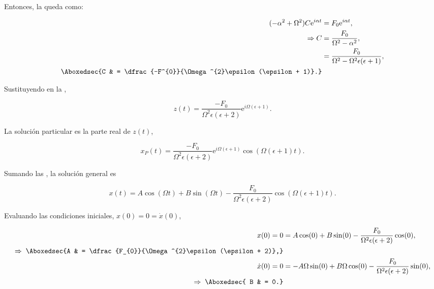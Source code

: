 \documentclass[../main.tex]{subfiles}
\begin{document}
Entonces, la  queda como:

\begin{align*}
	(-\alpha^{2} + \Omega^{2})C \mathrm{e}^{i\alpha t} & = F_{0}\mathrm{e}^{i\alpha t},                                  \\
	\Rightarrow C                                      & = \dfrac{F_{0}}{\Omega^{2} - \alpha^{2}},                       \\
	                                                   & = \dfrac{F_{0}}{\Omega^{2} - \Omega^{2}\epsilon(\epsilon + 1)}, \\
	\Aboxedsec{C                                       & = \dfrac{-F^{0}}{\Omega^{2}\epsilon(\epsilon + 1)}.}
\end{align*}

Sustituyendo en la ,

\begin{equation*}
	z(t) = \dfrac{-F_{0}}{\Omega^{2}\epsilon(\epsilon + 2)}\mathrm{e}^{i\Omega(\epsilon + 1)}.
\end{equation*}

La solución particular es la parte real de \(z(t)\),

\begin{equation}
	x_{P}(t) = \dfrac{-F_{0}}{\Omega^{2}\epsilon(\epsilon + 2)}\mathrm{e}^{i\Omega(\epsilon + 1)}\cos(\Omega(\epsilon + 1)t).
	\label{eq:particular-sol}
\end{equation}

Sumando las , la solución
general es

\begin{equation}
	x(t) = A\cos(\Omega t) + B\sin(\Omega t) - \dfrac{F_{0}}{\Omega^{2}\epsilon(\epsilon + 2)}\cos(\Omega(\epsilon + 1)t).
\end{equation}

Evaluando las condiciones iniciales, \(x(0) = 0 = \dot{x}(0)\),

\begin{align*}
	x(0) = 0                   & = A\cos(0) + B\sin(0) - \dfrac{F_{0}}{\Omega^{2}\epsilon(\epsilon + 2)}\cos(0),              \\
	\Rightarrow\;\Aboxedsec{A  & = \dfrac{F_{0}}{\Omega^{2}\epsilon(\epsilon + 2)},}                                          \\
	\dot{x}(0) = 0             & = -A\Omega\sin(0) + B\Omega\cos(0) - \dfrac{F_{0}}{\Omega^{2}\epsilon(\epsilon + 2)}\sin(0), \\
	\Rightarrow\;\Aboxedsec{ B & = 0.}
\end{align*}
\end{document}
